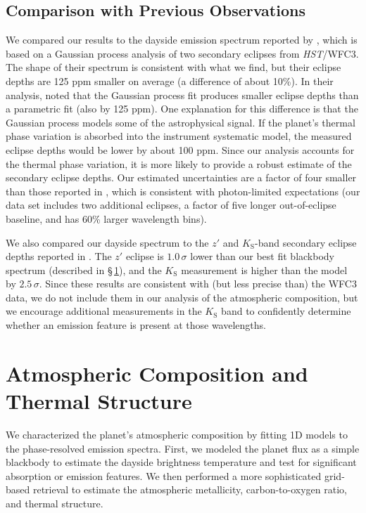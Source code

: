 \documentclass[twocolumn]{aastex61}
\newcommand{\project}[1]{\textsl{#1}}
\newcommand{\HST}{\project{HST}}
\begin{document}

\subsection{Comparison with Previous Observations}
We compared our results to the dayside emission spectrum reported by \cite{cartier17}, which is based on a Gaussian process analysis of two secondary eclipses from \HST/WFC3. The shape of their spectrum is consistent with what we find, but their eclipse depths are 125 ppm smaller on average (a difference of about 10\%). In their analysis, \cite{cartier17} noted that the Gaussian process fit produces smaller eclipse depths than a parametric fit (also by 125 ppm). One explanation for this difference is that the Gaussian process models some of the astrophysical signal. If the planet's thermal phase variation is absorbed into the instrument systematic model, the measured eclipse depths would be lower by about 100 ppm. Since our analysis accounts for the thermal phase variation, it is more likely to provide a robust estimate of the secondary eclipse depths.  Our estimated uncertainties are a factor of four smaller than those reported in \cite{cartier17}, which is consistent with photon-limited expectations (our data set includes two additional eclipses, a factor of five longer out-of-eclipse baseline, and has 60\% larger wavelength bins).

We also compared our dayside spectrum to the $z'$ and $K_\mathrm{S}$-band secondary eclipse depths reported in \cite{delrez18}. The $z'$ eclipse is $1.0\,\sigma$ lower than our best fit blackbody spectrum (described in \S\,\ref{sec:composition}), and the $K_\mathrm{S}$ measurement is higher than the model by $2.5\,\sigma$. Since these results are consistent with (but less precise than) the WFC3 data, we do not include them in our analysis of the atmospheric composition, but we encourage additional measurements in the $K_\mathrm{S}$ band to confidently determine whether an emission feature is present at those wavelengths.


\section{Atmospheric Composition and Thermal Structure}
\label{sec:composition}
We characterized the planet's atmospheric composition by fitting 1D models to the phase-resolved emission spectra.  First, we modeled the planet flux as a simple blackbody to estimate the dayside brightness temperature and test for significant absorption or emission features. We then performed a more sophisticated grid-based retrieval to estimate the atmospheric metallicity, carbon-to-oxygen ratio, and thermal structure.
\end{document}
